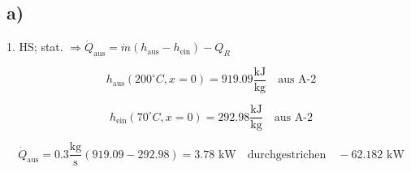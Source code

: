 

\subsection*{a)}
1. HS; stat. $\Rightarrow \dot{Q}_{\text{aus}} = \dot{m} (h_{\text{aus}} - h_{\text{ein}}) - Q_R$

\[
h_{\text{aus}} (200^\circ C, x=0) = 919.09 \frac{\text{kJ}}{\text{kg}} \quad \text{aus A-2}
\]

\[
h_{\text{ein}} (70^\circ C, x=0) = 292.98 \frac{\text{kJ}}{\text{kg}} \quad \text{aus A-2}
\]

\[
\dot{Q}_{\text{aus}} = 0.3 \frac{\text{kg}}{\text{s}} (919.09 - 292.98) = 3.78 \text{ kW} \quad \text{durchgestrichen} \quad -62.182 \text{ kW}
\]